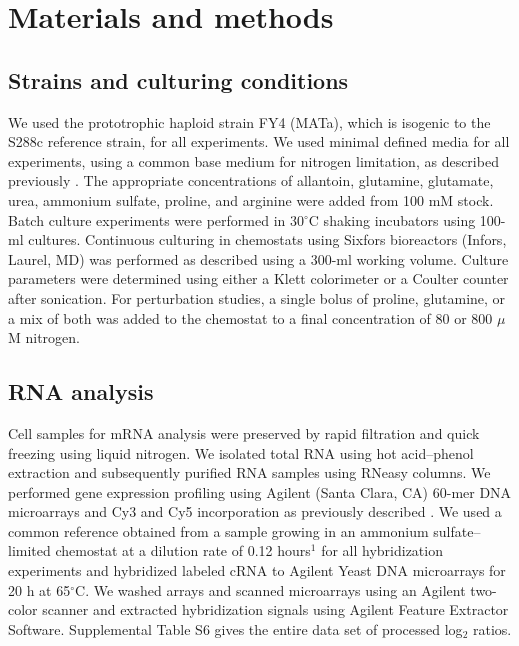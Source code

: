 \section{Materials and methods}

\subsection{Strains and culturing conditions}

We used the prototrophic haploid strain FY4 (MATa), which
is isogenic to the S288c reference strain, for all experiments. We
used minimal defined media for all experiments, using a common base
medium for nitrogen limitation, as described previously 
\parencite{brauer2008coordination,boer2010growth}. The appropriate concentrations of
allantoin, glutamine, glutamate, urea, ammonium sulfate, proline, and
arginine were added from 100 mM stock. Batch culture experiments were
performed in 30$^{\circ}$C shaking incubators using 100-ml cultures. Continuous
culturing in chemostats using Sixfors bioreactors (Infors, Laurel, MD)
was performed as described 
\parencite{brauer2008coordination,boer2010growth}
using a 300-ml working volume. Culture parameters were determined
using either a Klett colorimeter or a Coulter counter after
sonication. For perturbation studies, a single bolus of proline,
glutamine, or a mix of both was added to the chemostat to a final
concentration of 80 or 800 $\mu$M nitrogen.  

\subsection{RNA analysis} 

Cell samples for
mRNA analysis were preserved by rapid filtration and quick freezing
using liquid nitrogen. We isolated total RNA using hot acid–phenol
extraction and subsequently purified RNA samples using RNeasy columns.
We performed gene expression profiling using Agilent (Santa Clara, CA)
60-mer DNA microarrays and Cy3 and Cy5 incorporation as previously
described 
\parencite{brauer2008coordination}. We used a common reference obtained
from a sample growing in an ammonium sulfate–limited chemostat at a
dilution rate of 0.12 hours$^1$ for all hybridization experiments and
hybridized labeled cRNA to Agilent Yeast DNA microarrays for 20 h at
65$^{\circ}$C. We washed arrays and scanned microarrays using an Agilent
two-color scanner and extracted hybridization signals using Agilent
Feature Extractor Software. Supplemental Table S6 gives the entire
data set of processed log$_2$ ratios.  

